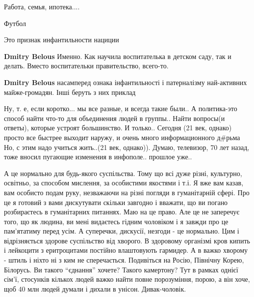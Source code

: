  
 
 
 
 
\zzSecCmt

\begin{itemize} %
Работа, семья, ипотека....

Футбол

Это признак инфантильности нациции

\begin{itemize} %
\textbf{Dmitry Belous} Именно. Как научила воспитателька в детском саду, так и делать. Вместо воспитательки правительство, всего-то.

\textbf{Dmitry Belous} насамперед ознака інфантильності і патерналізму най-активних майже-громадян.
Інші беруть з них приклад
\end{itemize} %


Ну, т. е, если коротко... мы все разные, и всегда такие были.. А политика-это
способ найти что-то для объединения людей в группы.. Найти вопросы(и ответы),
которые устроят большинство. И только.. Сегодня (21 век, однако) просто все
быстрее выходит наружу, и очень много информационного д\#рьма Но, с этим надо
учиться жить..(21 век, однако)). Думаю, телевизор, 70 лет назад, тоже вносил
пугающие изменения в инфополе.. прошлое уже..


А це нормально для будь-якого суспільства. Тому що всі дуже різні, культурно,
освітньо, за способом мислення, за особистими якостями і т.і. Я вже вам казав,
вам особисто подам руку, незважаючи на різні погляди в гуманітарній сфері. Про
це я готовий з вами дискутувати скільки завгодно і вважати, що ви погано
розбираєтесь в гуманітарних питаннях. Маю на це право. Але це не заперечує
того, що як людина, ви мені видаєтесь гідним чоловіком і я завжди про це
пам'ятатиму перед усім. А суперечки, дискусії, незгоди - це нормально. Цим і
відрізняється здорове суспільство від хворого. В здоровому організмі кров
кипить і лейкоцити з еритроцитами постійно влаштовують гармидер. А в важко
хворому - штиль і ніхто ні з ким не сперечається. Подивіться на Росію, Північну
Корею, Білорусь. Ви такого \enquote{єднання} хочете? Такого камертону? Тут в рамках
однієї сім'ї, стосунків кількох людей важко найти повне порозуміння, порою, а
він хоче, щоб 40 млн людей думали і дихали в унісон. Дивак-чоловік.



\end{itemize}

